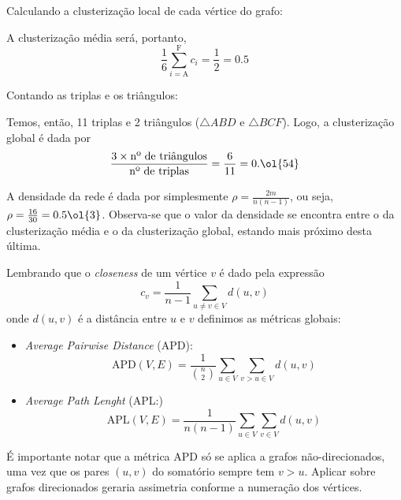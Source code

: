 \documentclass[l15, tikzdraw]{homework}
\begin{document}
	
	\subquest{}%
	Calculando a clusterização local de cada vértice do grafo:
	
	\begin{fig}
		
	\end{fig}

	A clusterização média será, portanto,
	$$\frac{1}{6} \sum_{i = \text{A}}^{\text{F}} c_i = \frac{1}{2} = 0.5$$

	\subquest{}%
	Contando as triplas e os triângulos:
	
	\begin{fig}
		
	\end{fig}

	Temos, então, 11 triplas e 2 triângulos ($\triangle ABD$ e $\triangle BCF$). Logo, a clusterização global é dada por
	$$\frac{3 \times \text{nº de triângulos}}{\text{nº de triplas}} = \frac{6}{11} = 0.\ol{54} $$

	\subquest{}%
	A densidade da rede é dada por simplesmente $\rho = \frac{2m}{n (n - 1)}$, ou seja, $\rho = \frac{16}{30} = 0.5\ol{3}$. Observa-se que o valor da densidade se encontra entre o da clusterização média e o da clusterização global, estando mais próximo desta última.


	Lembrando que o \textit{closeness} de um vértice $v$ é dado pela expressão
		$$c_v = \frac{1}{n - 1} \sum_{u \neq v \in V} d(u, v)$$
	onde $d(u, v)$ é a distância entre $u$ e $v$ definimos as métricas globais:
	\begin{itemize}
		\item \textit{Average Pairwise Distance} (APD): 
			$$\text{APD}(V, E) = \frac{1}{\binom{n}{2}} \sum_{u \in V} \sum_{v > u \in V} d(u, v)$$
		\item \textit{Average Path Lenght} (APL:) 
			$$\text{APL}(V, E) = \frac{1}{n (n - 1)} \sum_{u \in V} \sum_{v \in V} d(u, v)$$
	\end{itemize}
	É importante notar que a métrica APD só se aplica a grafos não-direcionados, uma vez que os pares $(u, v)$ do somatório sempre tem $v > u$. Aplicar sobre grafos direcionados geraria assimetria conforme a numeração dos vértices.
\end{document}
